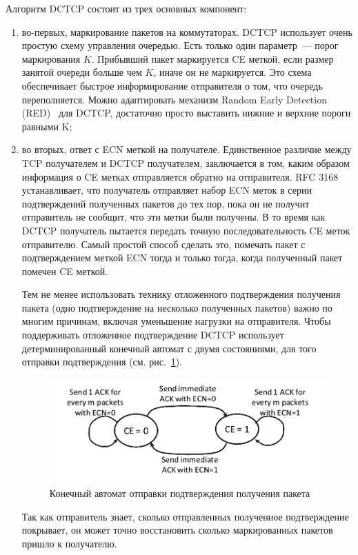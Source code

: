 \documentclass[14pt, a4paper,oneside]{extarticle}
\begin{document}
Алгоритм DCTCP состоит из трех основных компонент:
\begin{enumerate}

\item
во-первых, маркирование пакетов на коммутаторах.
DCTCP использует очень простую схему управления очередью. Есть только один параметр~--- порог маркирования $K$. Прибывший пакет маркируется CE меткой, если размер занятой очереди больше чем $K$, иначе он не маркируется. Это схема обеспечивает быстрое информирование отправителя о том, что очередь переполняется. Можно адаптировать механизм Random Early Detection (RED)~\cite{red} для DCTCP, достаточно просто выставить нижние и верхние пороги равными K;
\item
во вторых, ответ с ECN меткой на получателе. 
Единственное различие между TCP получателем и DCTCP получателем, заключается в том, каким образом информация о CE метках отправляется обратно на отправителя. RFC 3168 устанавливает, что получатель отправляет набор ECN меток в серии подтверждений полученных пакетов до тех пор, пока он не получит отправитель не сообщит, что эти метки были получены.
В то время как DCTCP получатель пытается передать точную последовательность CE меток отправителю. Самый простой способ сделать это, помечать пакет с подтверждением меткой ECN тогда и только тогда, когда полученный пакет помечен CE меткой.

Тем не менее использовать технику отложенного подтверждения получения пакета (одно подтверждение на несколько полученных пакетов) важно по многим причинам, включая уменьшение нагрузки на отправителя. Чтобы поддерживать отложенное подтверждение DCTCP использует детерминированный конечный автомат с двумя состояниями, для того отправки подтверждения (см. рис.~\ref{state_machine}).
\begin{figure}
\includegraphics[width=\linewidth]{state_machine.png}
\caption{Конечный автомат отправки подтверждения получения пакета}
\label{state_machine}
\end{figure}
Так как отправитель знает, сколько отправленных полученное подтверждение покрывает, он может точно восстановить сколько маркированных пакетов пришло к получателю.


\end{enumerate}
\end{document}
